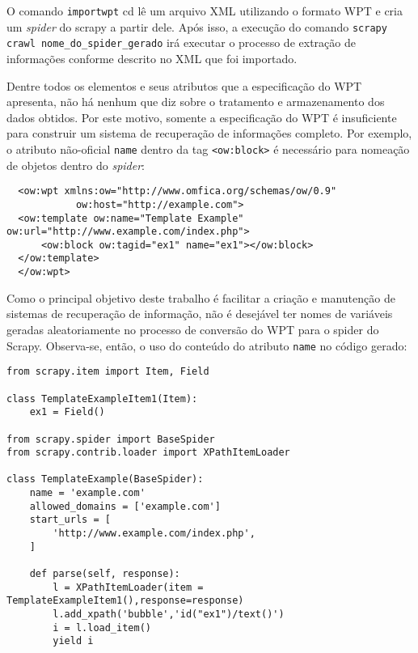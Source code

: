 O comando \texttt{importwpt} cd lê um arquivo XML utilizando o formato WPT e cria um \emph{spider} do scrapy a partir dele. Após isso, a execução do comando \texttt{scrapy crawl nome\_do\_spider\_gerado} irá executar o processo de extração de informações conforme descrito no XML que foi importado.

Dentre todos os elementos e seus atributos que a especificação do WPT apresenta, não há nenhum que diz sobre o tratamento e armazenamento dos dados obtidos. Por este motivo, somente a especificação do WPT é insuficiente para construir um sistema de recuperação de informações completo. Por exemplo, o atributo não-oficial \texttt{name} dentro da tag \texttt{<ow:block>} é necessário para nomeação de objetos dentro do \emph{spider}:

\begin{lstlisting}
  <ow:wpt xmlns:ow="http://www.omfica.org/schemas/ow/0.9"
            ow:host="http://example.com">
  <ow:template ow:name="Template Example" ow:url="http://www.example.com/index.php">
      <ow:block ow:tagid="ex1" name="ex1"></ow:block>
  </ow:template> 
  </ow:wpt>
\end{lstlisting}

Como o principal objetivo deste trabalho é facilitar a criação e manutenção de sistemas de recuperação de informação, não é desejável ter nomes de variáveis geradas aleatoriamente no processo de conversão do WPT para o spider do Scrapy. Observa-se, então, o uso do conteúdo do atributo \texttt{name} no código gerado:

\begin{lstlisting}
from scrapy.item import Item, Field

class TemplateExampleItem1(Item):
    ex1 = Field()

from scrapy.spider import BaseSpider
from scrapy.contrib.loader import XPathItemLoader

class TemplateExample(BaseSpider):
    name = 'example.com'
    allowed_domains = ['example.com']
    start_urls = [
        'http://www.example.com/index.php',
    ]

    def parse(self, response):
        l = XPathItemLoader(item = TemplateExampleItem1(),response=response)
        l.add_xpath('bubble','id("ex1")/text()') 
        i = l.load_item()
        yield i

\end{lstlisting}


